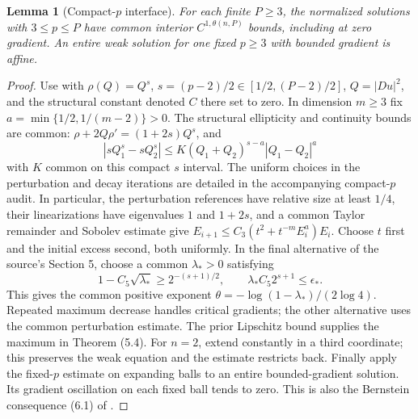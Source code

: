 \documentclass[11pt]{article}
\newtheorem{lemma}[theorem]{Lemma}
\theoremstyle{remark}\newtheorem{remark}[theorem]{Remark}
\begin{document}
\begin{lemma}[Compact-$p$ interface]\label{lem:compact-p}
For each finite $P\geq3$, the normalized solutions with $3\leq p\leq P$
have common interior $C^{1,\theta(n,P)}$ bounds, including at zero
gradient. An entire weak solution for one fixed $p\geq3$ with bounded
gradient is affine.
\end{lemma}
\begin{proof}
Use \cite[Theorem (5.4)]{Uhlenbeck} with
$\rho(Q)=Q^s$, $s=(p-2)/2\in[1/2,(P-2)/2]$, $Q=|Du|^2$, and
the structural constant denoted $C$ there set to zero. In dimension
$m\geq3$ fix $a=\min\{1/2,1/(m-2)\}>0$. The structural ellipticity
and continuity bounds are common: $\rho+2Q\rho'=(1+2s)Q^s$, and
\[
 |sQ_1^s-sQ_2^s|\leq K(Q_1+Q_2)^{s-a}|Q_1-Q_2|^a
\]
with $K$ common on this compact $s$ interval. The uniform choices in
the perturbation and decay iterations are detailed in the accompanying
compact-$p$ audit. In particular, the perturbation references have
relative size at least $1/4$, their linearizations have eigenvalues
$1$ and $1+2s$, and a common Taylor remainder and Sobolev estimate give
$E_{i+1}\leq C_3(t^2+t^{-m}E_i^a)E_i$. Choose $t$ first and the
initial excess second, both uniformly. In the final alternative of
the source's Section 5, choose a common $\lambda_*>0$ satisfying
\[
 1-C_5\sqrt{\lambda_*}\geq2^{-(s+1)/2},\qquad
 \lambda_*C_5 2^{s+1}\leq\epsilon_*.
\]
This gives the common positive exponent
$\theta=-\log(1-\lambda_*)/(2\log4)$. Repeated maximum decrease
handles critical gradients; the other alternative uses the common
perturbation estimate. The prior Lipschitz bound supplies the maximum
in Theorem (5.4). For $n=2$, extend constantly in a third coordinate;
this preserves the weak equation and the estimate restricts back.
Finally apply the fixed-$p$ estimate on expanding balls to an entire
bounded-gradient solution. Its gradient oscillation on each fixed
ball tends to zero. This is also the Bernstein consequence (6.1) of
\cite{Uhlenbeck}.
\end{proof}
\end{document}
